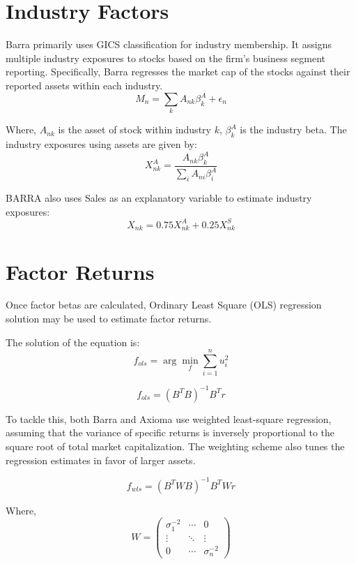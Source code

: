 \documentclass{article}
\begin{document}
\section*{Industry Factors}
Barra primarily uses GICS classification for industry membership. It assigns multiple industry exposures to stocks based on the firm’s business segment reporting. Specifically, Barra regresses the market cap of the stocks against their reported assets within each industry.
\begin{equation}
M_n = \sum_{k} A_{nk} \beta^A_k + \epsilon_n
\end{equation}

Where, \( A_{nk} \) is the asset of stock within industry \( k \), \( \beta^A_k \) is the industry beta. The industry exposures using assets are given by:
\begin{equation}
X^A_{nk} = \frac{A_{nk} \beta^A_k}{\sum_i A_{ni} \beta^A_i}
\end{equation}

BARRA also uses Sales as an explanatory variable to estimate industry exposures:
\begin{equation}
X_{nk} = 0.75 X^A_{nk} + 0.25 X^S_{nk}
\end{equation}

\section*{Factor Returns}
Once factor betas are calculated, Ordinary Least Square (OLS) regression solution may be used to estimate factor returns.

The solution of the equation is:
\begin{equation}
f_{ols} = \arg\min_{f} \sum_{i=1}^{n} u_i^2
\end{equation}

\begin{equation}
f_{ols} = (B^T B)^{-1} B^T r
\end{equation}

To tackle this, both Barra and Axioma use weighted least-square regression, assuming that the variance of specific returns is inversely proportional to the square root of total market capitalization. The weighting scheme also tunes the regression estimates in favor of larger assets.

\begin{equation}
f_{wls} = (B^T W B)^{-1} B^T W r
\end{equation}

Where, 
\begin{equation}
W = \begin{pmatrix}
\sigma_1^{-2} & \cdots & 0 \\
\vdots & \ddots & \vdots \\
0 & \cdots & \sigma_n^{-2}
\end{pmatrix}
\end{equation}
\end{document}
